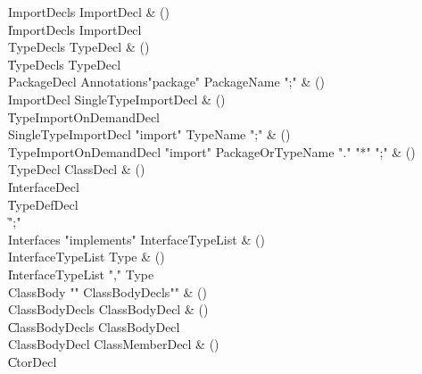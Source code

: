 \begin{bbgrammar}

 ImportDecls  \label{prod:ImportDecls}  \: ImportDecl & ()\\
    \| ImportDecls ImportDecl\\
 TypeDecls  \label{prod:TypeDecls}  \: TypeDecl & ()\\
    \| TypeDecls TypeDecl\\
 PackageDecl  \label{prod:PackageDecl}  \: Annotations\opt \xcd"package" PackageName \xcd";" & ()\\
 ImportDecl  \label{prod:ImportDecl}  \: SingleTypeImportDecl & ()\\
    \| TypeImportOnDemandDecl\\
 SingleTypeImportDecl  \label{prod:SingleTypeImportDecl}  \: \xcd"import" TypeName \xcd";" & ()\\
 TypeImportOnDemandDecl  \label{prod:TypeImportOnDemandDecl}  \: \xcd"import" PackageOrTypeName \xcd"." \xcd"*" \xcd";" & ()\\
 TypeDecl  \label{prod:TypeDecl}  \: ClassDecl & ()\\
    \| InterfaceDecl\\
    \| TypeDefDecl\\
    \| \xcd";"\\
 Interfaces  \label{prod:Interfaces}  \: \xcd"implements" InterfaceTypeList & ()\\
 InterfaceTypeList  \label{prod:InterfaceTypeList}  \: Type & ()\\
    \| InterfaceTypeList \xcd"," Type\\
 ClassBody  \label{prod:ClassBody}  \: \xcd"{" ClassBodyDecls\opt \xcd"}" & ()\\
 ClassBodyDecls  \label{prod:ClassBodyDecls}  \: ClassBodyDecl & ()\\
    \| ClassBodyDecls ClassBodyDecl\\
 ClassBodyDecl  \label{prod:ClassBodyDecl}  \: ClassMemberDecl & ()\\
    \| CtorDecl\\

\end{bbgrammar}
